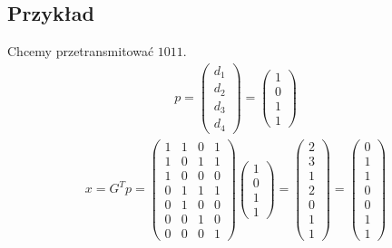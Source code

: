 \subsection{Przykład}
Chcemy przetransmitować $1011$.
\begin{align*}
    p=\begin{pmatrix}
          d_1 \\
          d_2 \\
          d_3 \\
          d_4
    \end{pmatrix} = \begin{pmatrix}
                        1 \\
                        0 \\
                        1 \\
                        1
    \end{pmatrix}
\end{align*}
\begin{align*}
    x=G^{T}p=\begin{pmatrix}
                 1 & 1 & 0 & 1 \\
                 1 & 0 & 1 & 1 \\
                 1 & 0 & 0 & 0 \\
                 0 & 1 & 1 & 1 \\
                 0 & 1 & 0 & 0 \\
                 0 & 0 & 1 & 0 \\
                 0 & 0 & 0 & 1
    \end{pmatrix}
    \begin{pmatrix}
        1 \\
        0 \\
        1 \\
        1
    \end{pmatrix}=
    \begin{pmatrix}
        2 \\
        3 \\
        1 \\
        2 \\
        0 \\
        1 \\
        1
    \end{pmatrix}=
    \begin{pmatrix}
        0 \\
        1 \\
        1 \\
        0 \\
        0 \\
        1 \\
        1
    \end{pmatrix}
\end{align*}

